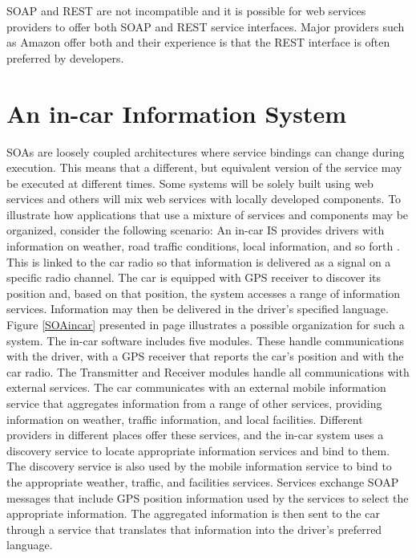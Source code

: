 \documentclass[12pt,a4paper,final,twoside,onecolumn,titlepage]{book}
\begin{document}
\gls{SOAP} and REST are not incompatible and it is possible for web services providers to offer both \gls{SOAP} and REST service interfaces. Major providers such as Amazon offer both and their experience is that the REST interface is often preferred by developers.

\section{An in-car Information System}
\gls{SOA}s are loosely coupled architectures where service bindings can change during execution. This means that a different, but equivalent version of the service may be executed at different times. Some systems will be solely built using web services and others will mix web services with locally developed components. To illustrate how applications that use a mixture of services and components may be organized, consider the following scenario:
An in-car \gls{IS} provides drivers with information on weather, road traffic conditions, local information, and so forth  \cite{SWE9}. This is linked to the car radio so that information is delivered as a signal on a specific radio channel. The car is equipped with GPS receiver to discover its position and, based on that position, the system accesses a range of information services. Information may then be delivered in the driver’s specified language.
Figure \ref{SOAincar} presented in page \pageref{SOAincar} illustrates a possible organization for such a system. The in-car software includes five modules. These handle communications with the driver, with a GPS receiver that reports the car’s position and with the car radio. The Transmitter and Receiver modules handle all communications with external services.
The car communicates with an external mobile information service that aggregates information from a range of other services, providing information on weather, traffic information, and local facilities. Different providers in different places offer these services, and the in-car system uses a discovery service to locate appropriate information services and bind to them. The discovery service is also used by the mobile information service to bind to the appropriate weather, traffic, and facilities services. Services exchange \gls{SOAP} messages that include GPS position information used by the services to select the appropriate information. The aggregated information is then sent to the car through a service that translates that information into the driver’s preferred language.
\end{document}
